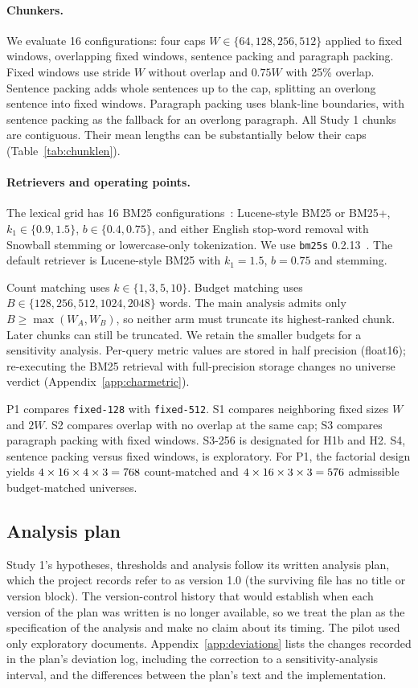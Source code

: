 \documentclass[11pt]{article}
\newcommand{\chunk}[1]{\texttt{#1}}
\begin{document}
\paragraph{Chunkers.}
We evaluate 16 configurations: four caps $W\in\{64,128,256,512\}$ applied to fixed windows, overlapping fixed windows, sentence packing and paragraph packing. Fixed windows use stride $W$ without overlap and $0.75W$ with 25\% overlap. Sentence packing adds whole sentences up to the cap, splitting an overlong sentence into fixed windows. Paragraph packing uses blank-line boundaries, with sentence packing as the fallback for an overlong paragraph. All Study 1 chunks are contiguous. Their mean lengths can be substantially below their caps (Table~\ref{tab:chunklen}).

\paragraph{Retrievers and operating points.}
The lexical grid has 16 BM25 configurations~\cite{robertson2009bm25}: Lucene-style BM25 or BM25+, $k_1\in\{0.9,1.5\}$, $b\in\{0.4,0.75\}$, and either English stop-word removal with Snowball stemming or lowercase-only tokenization. We use \texttt{bm25s} 0.2.13~\cite{lu2024bm25s}. The default retriever is Lucene-style BM25 with $k_1=1.5$, $b=0.75$ and stemming.

Count matching uses $k\in\{1,3,5,10\}$. Budget matching uses $B\in\{128,256,512,1024,2048\}$ words. The main analysis admits only $B\geq\max(W_A,W_B)$, so neither arm must truncate its highest-ranked chunk. Later chunks can still be truncated. We retain the smaller budgets for a sensitivity analysis. Per-query metric values are stored in half precision (float16); re-executing the BM25 retrieval with full-precision storage changes no universe verdict (Appendix~\ref{app:charmetric}).

P1 compares \chunk{fixed-128} with \chunk{fixed-512}. S1 compares neighboring fixed sizes $W$ and $2W$. S2 compares overlap with no overlap at the same cap; S3 compares paragraph packing with fixed windows. S3-256 is designated for H1b and H2. S4, sentence packing versus fixed windows, is exploratory. For P1, the factorial design yields $4\times16\times4\times3=768$ count-matched and $4\times16\times3\times3=576$ admissible budget-matched universes.

\subsection{Analysis plan}
Study 1's hypotheses, thresholds and analysis follow its written analysis plan, which the project records refer to as version 1.0 (the surviving file has no title or version block). The version-control history that would establish when each version of the plan was written is no longer available, so we treat the plan as the specification of the analysis and make no claim about its timing. The pilot used only exploratory documents. Appendix~\ref{app:deviations} lists the changes recorded in the plan's deviation log, including the correction to a sensitivity-analysis interval, and the differences between the plan's text and the implementation.
\end{document}
